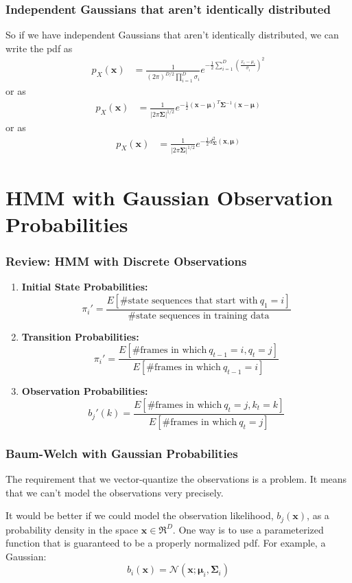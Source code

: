 \documentclass{beamer}
\begin{document}
\begin{frame}
  \frametitle{Independent Gaussians that aren’t identically distributed}

  So if we have independent Gaussians that aren't identically
  distributed, we can write the pdf as
  \begin{align*}
    p_X(\mathbf{x}) &= 
    \frac{1}{(2\pi)^{D/2}\prod_{i=1}^D\sigma_i}e^{-\frac{1}{2}\sum_{i=1}^D\left(\frac{x_i-\mu_i}{\sigma_i}\right)^2}
  \end{align*}
  or as
  \begin{align*}
    p_X(\mathbf{x}) &=
    \frac{1}{|2\pi\mathbf{\Sigma}|^{1/2}}e^{-\frac{1}{2}(\mathbf{x}-\bm{\mu})^T\mathbf{\Sigma}^{-1}(\mathbf{x}-\bm{\mu})}
  \end{align*}
  or as
  \begin{align*}
    p_X(\mathbf{x}) &=
    \frac{1}{|2\pi\mathbf{\Sigma}|^{1/2}}e^{-\frac{1}{2}d_{\mathbf{\Sigma}}^2(\mathbf{x},\bm{\mu})}
  \end{align*}
\end{frame}


\section[HMM]{HMM with Gaussian Observation Probabilities}
\setcounter{subsection}{1}

\begin{frame}
  \frametitle{Review: HMM with Discrete Observations}

  \begin{enumerate}
  \item {\bf Initial State Probabilities:}
    \[
    \pi_i'=\frac{E\left[\mbox{\# state sequences that start with}~q_1=i\right]}{\mbox{\# state sequences in training data}}
    \]
  \item {\bf Transition Probabilities:}
    \[
    \pi_i'=\frac{E\left[\mbox{\# frames in which}~q_{t-1}=i,q_t=j\right]}{E\left[\mbox{\# frames in which}~q_{t-1}=i\right]}
    \]
  \item {\bf Observation Probabilities:} 
    \[
    b_j'(k)=\frac{E\left[\mbox{\# frames in which}~q_t=j,k_t=k\right]}{E\left[\mbox{\# frames in which}~q_{t}=j\right]}
    \]
  \end{enumerate}
\end{frame}

\begin{frame}
  \frametitle{Baum-Welch with Gaussian Probabilities}

  The requirement that we vector-quantize the observations is a
  problem.  It means that we can't model the observations very precisely.

  It would be better if we could model the observation likelihood,
  $b_j(\mathbf{x})$, as a probability density in the space
  $\mathbf{x}\in\Re^D$.  One way is to use a parameterized function that
  is guaranteed to be a properly normalized pdf.  For example, a
  Gaussian:
  \begin{displaymath}
    b_i(\mathbf{x}) = {\mathcal N}\left(\mathbf{x};\bm{\mu}_i,\mathbf{\Sigma}_i\right)
  \end{displaymath}
\end{frame}
  
\end{document}
